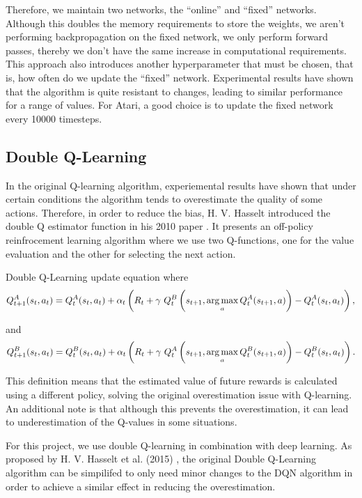 Therefore, we maintain two networks, the ``online'' and ``fixed'' networks. Although this doubles the memory requirements to store the weights, we aren't performing backpropagation on the fixed network, we only perform forward passes, thereby we don't have the same increase in computational requirements. This approach also introduces another hyperparameter that must be chosen, that is, how often do we update the ``fixed'' network. Experimental results have shown that the algorithm is quite resistant to changes, leading to similar performance for a range of values. For Atari, a good choice is to update the fixed network every 10000 timesteps.

\subsection{Double Q-Learning}
\label{dsgn:sec:qlearning:doubledqn}
In the original Q-learning algorithm, experiemental results have shown that under certain conditions the algorithm tends to overestimate the quality of some actions. Therefore, in order to reduce the bias, H. V. Hasselt introduced the double Q estimator function in his 2010 paper \cite{double-ql}. It presents an off-policy reinfrocement learning algorithm where we use two Q-functions, one for the value evaluation and the other for selecting the next action.

\begin{defn}
	Double Q-Learning update equation where
	\[
		Q_{t+1}^A (s_t, a_t) = Q_t^A (s_t, a_t) + \alpha_t \left( R_t + \gamma~Q_t^B \left( s_{t + 1}, \operatorname*{arg\,max}_a Q_t^A (s_{t + 1}, a) \right) - Q_t^A (s_t, a_t) \right) ,
	\]

	and
	\[
		Q_{t+1}^B (s_t, a_t) = Q_t^B (s_t, a_t) + \alpha_t \left( R_t + \gamma~Q_t^A \left( s_{t + 1}, \operatorname*{arg\,max}_a Q_t^B (s_{t + 1}, a) \right) - Q_t^B (s_t, a_t) \right) .
	\]
\end{defn}

This definition means that the estimated value of future rewards is calculated using a different policy, solving the original overestimation issue with Q-learning. An additional note is that although this prevents the overestimation, it can lead to underestimation of the Q-values in some situations.

For this project, we use double Q-learning in combination with deep learning. As proposed by H. V. Hasselt et al. (2015) \cite{deep-double-qlearning}, the original Double Q-Learning algorithm can be simpilifed to only need minor changes to the DQN algorithm in order to achieve a similar effect in reducing the overestimation.

